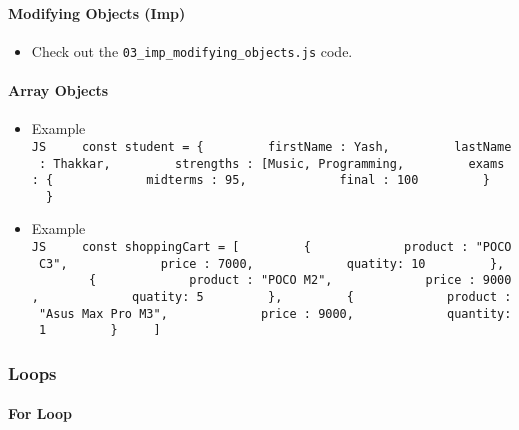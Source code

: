 \documentclass[
  paper=a4,
  ,captions=tableheading
]{scrartcl}
\providecommand{\tightlist}{%
  \setlength{\itemsep}{0pt}\setlength{\parskip}{0pt}}
\begin{document}
\hypertarget{modifying-objects-imp}{%
\paragraph{Modifying Objects (Imp)}\label{modifying-objects-imp}}

\begin{itemize}
\tightlist
\item
  Check out the \texttt{03\_imp\_modifying\_objects.js} code.
\end{itemize}

\hypertarget{array-objects}{%
\paragraph{Array Objects}\label{array-objects}}

\begin{itemize}
\item
  Example
  \texttt{JS\ \ \ \ \ const\ student\ =\ \{\ \ \ \ \ \ \ \ \ firstName\ :\ \textquotesingle{}Yash\textquotesingle{},\ \ \ \ \ \ \ \ \ lastName\ :\ \textquotesingle{}Thakkar\textquotesingle{},\ \ \ \ \ \ \ \ \ strengths\ :\ {[}\textquotesingle{}Music\textquotesingle{},\ \textquotesingle{}Programming\textquotesingle{}{]},\ \ \ \ \ \ \ \ \ exams\ :\ \{\ \ \ \ \ \ \ \ \ \ \ \ \ midterms\ :\ 95,\ \ \ \ \ \ \ \ \ \ \ \ \ final\ :\ 100\ \ \ \ \ \ \ \ \ \}\ \ \ \ \ \}}
\item
  Example
  \texttt{JS\ \ \ \ \ const\ shoppingCart\ =\ {[}\ \ \ \ \ \ \ \ \ \{\ \ \ \ \ \ \ \ \ \ \ \ \ product\ :\ "POCO\ C3",\ \ \ \ \ \ \ \ \ \ \ \ \ price\ :\ 7000,\ \ \ \ \ \ \ \ \ \ \ \ \ quatity:\ 10\ \ \ \ \ \ \ \ \ \},\ \ \ \ \ \ \ \ \ \{\ \ \ \ \ \ \ \ \ \ \ \ \ product\ :\ "POCO\ M2",\ \ \ \ \ \ \ \ \ \ \ \ \ price\ :\ 9000,\ \ \ \ \ \ \ \ \ \ \ \ \ quatity:\ 5\ \ \ \ \ \ \ \ \ \},\ \ \ \ \ \ \ \ \ \{\ \ \ \ \ \ \ \ \ \ \ \ \ product\ :\ "Asus\ Max\ Pro\ M3",\ \ \ \ \ \ \ \ \ \ \ \ \ price\ :\ 9000,\ \ \ \ \ \ \ \ \ \ \ \ \ quantity:\ 1\ \ \ \ \ \ \ \ \ \}\ \ \ \ \ {]}}
\end{itemize}

\hypertarget{loops}{%
\subsubsection{Loops}\label{loops}}

\hypertarget{for-loop}{%
\paragraph{For Loop}\label{for-loop}}
\end{document}
